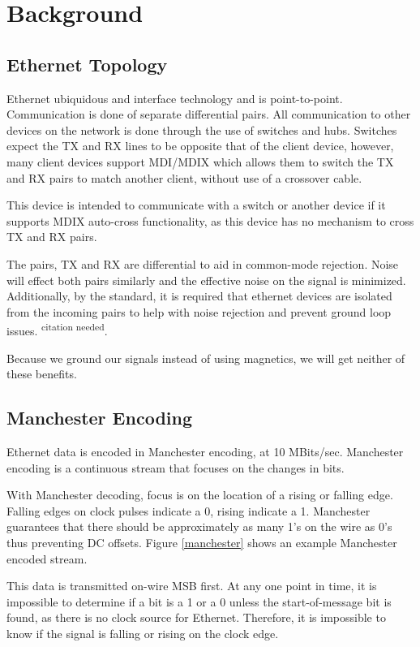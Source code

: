 \documentclass{article}
\begin{document}
\section{Background}

\subsection{Ethernet Topology}
Ethernet ubiquidous and interface technology and is point-to-point.  Communication is
done of separate differential pairs.  All communication to other devices on the network
is done through the use of switches and hubs.  Switches expect the TX and RX lines to
be opposite that of the client device, however, many client devices support MDI/MDIX
which allows them to switch the TX and RX pairs to match another client, without use
of a crossover cable.

This device is intended to communicate
with a switch or another device if it supports MDIX auto-cross functionality, as
this device has no mechanism to cross TX and RX pairs.

The pairs, TX and RX are differential to aid in common-mode rejection.  Noise
will effect both pairs similarly and the effective noise on the signal is minimized.
Additionally, by the standard, it is required that ethernet devices are isolated
from the incoming pairs to help with noise rejection and prevent ground loop issues.
\textsuperscript{citation needed}.

Because we ground our signals instead of using magnetics, we will get neither of these
benefits.

\subsection{Manchester Encoding}
Ethernet data is encoded in Manchester encoding, at 10 MBits/sec.  Manchester encoding
is a continuous stream that focuses on the changes in bits.

With Manchester decoding, focus is on the location of a rising or falling edge.  Falling 
edges on clock pulses indicate a 0, rising indicate a 1.  Manchester guarantees that there
should be approximately as many 1's on the wire as 0's thus preventing DC offsets.  Figure \ref{manchester}
shows an example Manchester encoded stream.  

This data is transmitted on-wire MSB first.  At any one point in time, it is impossible to
determine if a bit is a 1 or a 0 unless the start-of-message bit is found, as there is no
clock source for Ethernet.  Therefore, it is impossible to know if the signal is falling or
rising on the clock edge.
\end{document}
